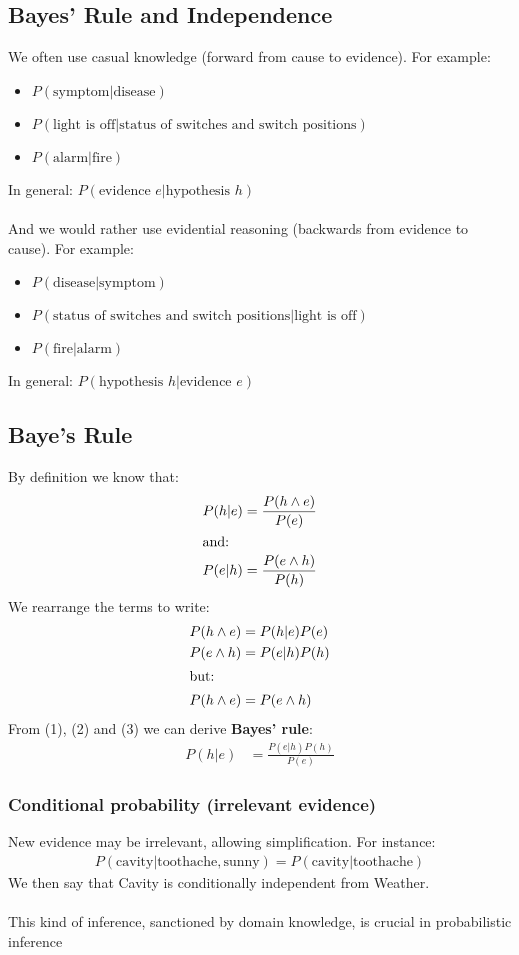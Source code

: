 \documentclass{article}
\def\red#1{{\color{red}#1}}
\begin{document}
\subsection*{Bayes' Rule and Independence}
We often use \red{casual knowledge} (forward from cause to evidence). For example:
\begin{itemize}
	\item $ P(\text{symptom} | \text{disease}) $
	\item $ P(\text{light is off} | \text{status of switches and switch positions}) $
	\item $ P(\text{alarm} | \text{fire}) $
\end{itemize}
In general: $ P(\text{evidence } e | \text{hypothesis } h) $\\
\\
And we would rather use \red{evidential reasoning} (backwards from evidence to cause). For example:
\begin{itemize}
	\item $ P(\text{disease} | \text{symptom}) $
	\item $ P(\text{status of switches and switch positions} | \text{light is off}) $
	\item $ P(\text{fire} | \text{alarm}) $
\end{itemize}
In general: $ P(\text{hypothesis } h | \text{evidence } e) $

\subsection*{Baye's Rule}
By definition we know that:
\begin{align*}
P(h|e) &=\frac{P(h \land e)}{P(e)} \\
\intertext{and:}
P(e|h) &=\frac{P(e \land h)}{P(h)}
\end{align*}
We rearrange the terms to write:
\begin{align}
P(h \land e) &= P(h|e) P(e) \\
P(e \land h) &= P(e|h)P(h) \\
\intertext{but:}
P(h \land e) &= P(e \land h) 
\end{align}
From (1), (2) and (3) we can derive \textbf{Bayes' rule}:
\begin{align*}
P(h|e) &= \frac{P(e|h)P(h)}{P(e)}
\end{align*}

\subsubsection*{Conditional probability (irrelevant evidence)}
New evidence may be irrelevant, allowing simplification. For instance:
\begin{align*}
P(\text{cavity} | \text{toothache}, \text{sunny}) = P(\text{cavity} | \text{toothache})
\end{align*}
We then say that Cavity is conditionally independent from Weather. \\
\\
This kind of inference, sanctioned by domain knowledge, is crucial in probabilistic inference
\end{document}
